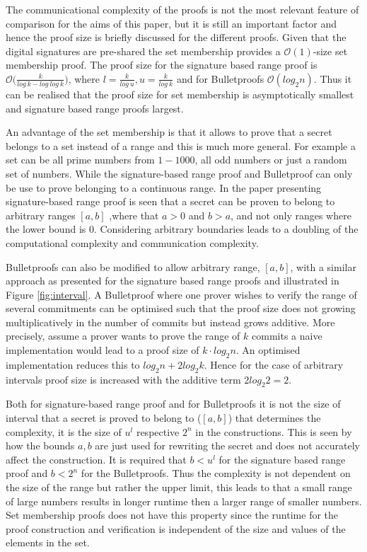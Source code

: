 The communicational complexity of the proofs is not the most relevant feature of comparison for the aims of this paper, but it is still an important factor and hence the proof size is briefly discussed  for the different proofs. Given that the digital signatures are pre-shared the set membership provides a $\mathcal{O}(1)$-size set membership proof. The proof size for the signature based range proof is $\mathcal{O}\big(\frac{k}{log\: k- log\:log\:k}\big)$, where $l = \frac{k}{log\: u}, u = \frac{k}{log\: k}$ and for Bulletproofs $\mathcal{O}(log_2n)$. Thus it can be realised that the proof size for set membership is asymptotically smallest and signature based range proofs largest. 

An advantage of the set membership is that it allows to prove that a secret belongs to a set instead of a range and this is much more general. For example a set can be all prime numbers from $1-1000$, all odd numbers or just a random set of numbers. While the signature-based range proof and Bulletproof can only be use to prove belonging to a continuous range. In the paper presenting signature-based range proof is seen that a secret can be proven to belong to arbitrary ranges $[a,b]$ ,where that $a>0$ and $b>a$, and not only ranges where the lower bound is $0$. Considering arbitrary boundaries leads to a doubling of the computational complexity and communication complexity. 

Bulletproofs can also be modified to allow arbitrary range, $[a,b]$, with a similar approach as presented for the signature based range proofs and illustrated in Figure \ref{fig:interval}. A Bulletproof where one prover wishes to verify the range of several commitments can be optimised such that the  proof size does not growing multiplicatively in the number of commits but instead grows additive. More precisely, assume a prover wants to prove the range of $k$ commits a naive implementation would lead to a proof size of $k\cdot log_2 n $. An optimised implementation reduces this to $log_2 n + 2 log_2 k$.  Hence for the case of arbitrary intervals  proof size is increased with the additive term $2log_2 2 = 2$. 

Both for signature-based range proof and for Bulletproofs it is not the  size of interval that a secret is proved to belong to ($[a,b]$) that determines the complexity, it is the size of $u^l$ respective $2^n$ in the constructions. This is seen by how the bounds $a,b$ are just used for rewriting the secret and does not accurately affect the construction.
It is required that $b< u^l$ for the signature based range proof and $b<2^n$ for the Bulletproofs. Thus the complexity is not dependent on the size of the range but rather the upper limit, this leads to that a small range of large numbers results in longer runtime then a larger range of smaller numbers. Set membership proofs does not have this property since the runtime for the proof construction and verification is independent of the size and values of the elements in the set. 

